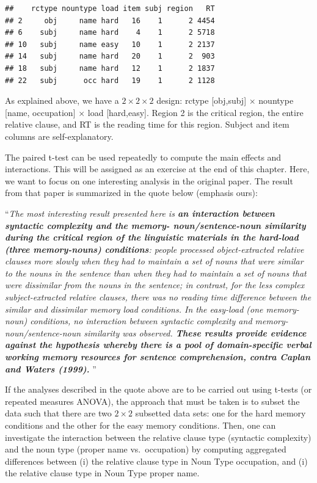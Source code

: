 \documentclass[
  12pt,
]{krantz}
\theoremstyle{definition}
\theoremstyle{definition}
\theoremstyle{definition}
\theoremstyle{definition}
\theoremstyle{remark}
\begin{document}
\begin{verbatim}
##    rctype nountype load item subj region   RT
## 2     obj     name hard   16    1      2 4454
## 6    subj     name hard    4    1      2 5718
## 10   subj     name easy   10    1      2 2137
## 14   subj     name hard   20    1      2  903
## 18   subj     name hard   12    1      2 1837
## 22   subj      occ hard   19    1      2 1128
\end{verbatim}

As explained above, we have a \(2\times 2\times 2\) design: rctype {[}obj,subj{]} \(\times\) nountype {[}name, occupation{]} \(\times\) load {[}hard,easy{]}. Region 2 is the critical region, the entire relative clause, and RT is the reading time for this region. Subject and item columns are self-explanatory.

The paired t-test can be used repeatedly to compute the main effects and interactions. This will be assigned as an exercise at the end of this chapter. Here, we want to focus on one interesting analysis in the original paper. The result from that paper is summarized in the quote below (emphasis ours):

``\emph{The most interesting result presented here is \textbf{an interaction between syntactic complexity and the memory- noun/sentence-noun similarity during the critical region of the linguistic materials in the hard-load (three memory-nouns) conditions}: people processed object-extracted relative clauses more slowly when they had to maintain a set of nouns that were similar to the nouns in the sentence than when they had to maintain a set of nouns that were dissimilar from the nouns in the sentence; in contrast, for the less complex subject-extracted relative clauses, there was no reading time difference between the similar and dissimilar memory load conditions. In the easy-load (one memory-noun) conditions, no interaction between syntactic complexity and memory-noun/sentence-noun similarity was observed.
\textbf{These results provide evidence against the hypothesis whereby there is a pool of domain-specific verbal working memory resources for sentence comprehension, contra Caplan and Waters (1999).}
}''

If the analyses described in the quote above are to be carried out using t-tests (or repeated measures ANOVA), the approach that must be taken is to subset the data such that there are two \(2\times 2\) subsetted data sets: one for the hard memory conditions and the other for the easy memory conditions. Then, one can investigate the interaction between the relative clause type (syntactic complexity) and the noun type (proper name vs.~occupation) by computing aggregated differences between (i) the relative clause type in Noun Type occupation, and (i) the relative clause type in Noun Type proper name.
\end{document}
